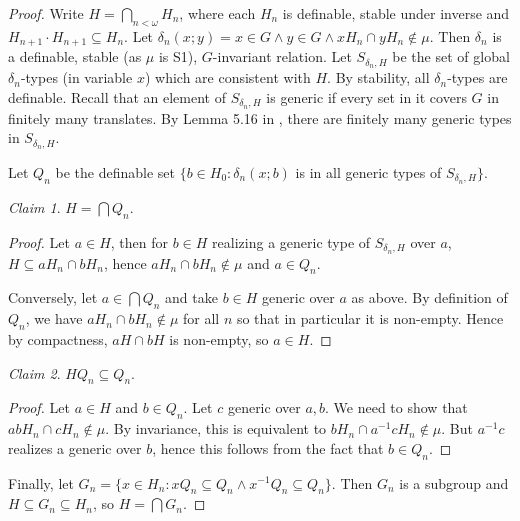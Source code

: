 \documentclass[12pt]{article}
\theoremstyle{definition}
\theoremstyle{mystyle}
\theoremstyle{remark}
\newtheorem*{claim}{Claim}
\newenvironment{claimproof}
    {\begin{proof}}{\renewcommand\qedsymbol{\Squarepipe} \end{proof}}
\begin{document}
\begin{proof}




Write $H=\bigcap_{n<\omega} H_n$, where each $H_n$ is definable,
stable under inverse and $H_{n+1} \cdot H_{n+1} \subseteq H_n$.
Let $\delta_n(x;y)= x\in G \wedge y\in G \wedge xH_n \cap yH_n
\notin \mu$. Then $\delta_n$ is a definable, stable (as $\mu$ is
S1), $G$-invariant relation. Let $S_{\delta_n,H}$ be the set of
global $\delta_n$-types (in variable $x$) which are consistent
with $H$. By stability, all $\delta_n$-types are definable. Recall
that an element of $S_{\delta_n,H}$ is generic if every set in it
covers $G$ in finitely many translates. By Lemma 5.16 in
\cite{HrPi}, there are finitely many generic types in
$S_{\delta_n,H}$.

Let $Q_n$ be the definable set $\{b\in H_0 : \delta_n(x;b)$ is in
all generic types of $S_{\delta_n,H}\}$.

\begin{claim} $H= \bigcap Q_n$.
\end{claim}

\begin{claimproof} Let $a\in H$, then for $b\in H$ realizing a generic type of
$S_{\delta_n,H}$ over $a$, $H\subseteq aH_n \cap bH_n$, hence
$aH_n \cap bH_n\notin \mu$ and $a\in Q_n$.

Conversely, let $a\in \bigcap Q_n$ and take $b\in H$ generic over
$a$ as above. By definition of $Q_n$, we have $aH_n \cap bH_n
\notin \mu$ for all $n$ so that in particular it is non-empty.
Hence by compactness, $aH\cap bH$ is non-empty, so $a\in H$.
\end{claimproof}


\begin{claim} $HQ_n \subseteq Q_n$.
\end{claim}

\begin{claimproof} Let $a\in H$ and $b\in Q_n$. Let $c$ generic over $a,b$. We
need to show that $abH_n \cap cH_n\notin \mu$. By invariance, this
is equivalent to $bH_n \cap a^{-1}cH_n\notin \mu$. But $a^{-1}c$
realizes a generic over $b$, hence this follows from the fact that
$b\in Q_n$.
\end{claimproof}

Finally, let $G_n = \{x \in H_n : xQ_n \subseteq Q_n \wedge
x^{-1}Q_n \subseteq Q_n\}$. Then $G_n$ is a subgroup and
$H\subseteq G_n \subseteq H_n$, so $H=\bigcap G_n$.
\end{proof}
\end{document}
